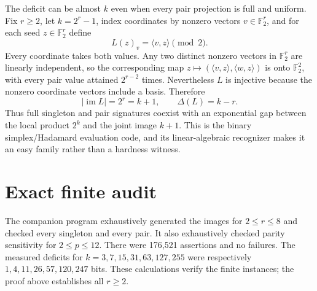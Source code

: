\documentclass[11pt]{article}
\begin{document}
The deficit can be almost $k$ even when every pair projection is full and
uniform.  Fix $r\ge2$, let $k=2^r-1$, index coordinates by nonzero vectors
$v\in\mathbb F_2^r$, and for each seed $z\in\mathbb F_2^r$ define
\[
  L(z)_v=\langle v,z\rangle\pmod2.
\]
Every coordinate takes both values.  Any two distinct nonzero vectors in
$\mathbb F_2^r$ are linearly independent, so the corresponding map
$z\mapsto(\langle v,z\rangle,\langle w,z\rangle)$ is onto
$\mathbb F_2^2$, with every pair value attained $2^{r-2}$ times.  Nevertheless
$L$ is injective because the nonzero coordinate vectors include a basis.
Therefore
\[
 |\operatorname{im}L|=2^r=k+1,
 \qquad \Delta(L)=k-r.
\]
Thus full singleton and pair signatures coexist with an exponential gap
between the local product $2^k$ and the joint image $k+1$.  This is the binary
simplex/Hadamard evaluation code, and its linear-algebraic recognizer makes it
an easy family rather than a hardness witness.

\section*{Exact finite audit}
The companion program exhaustively generated the images for $2\le r\le8$ and
checked every singleton and every pair.  It also exhaustively checked parity
sensitivity for $2\le p\le12$.  There were 176,521 assertions and no failures.
The measured deficits for $k=3,7,15,31,63,127,255$ were respectively
$1,4,11,26,57,120,247$ bits.  These calculations verify the finite instances;
the proof above establishes all $r\ge2$.
\end{document}
